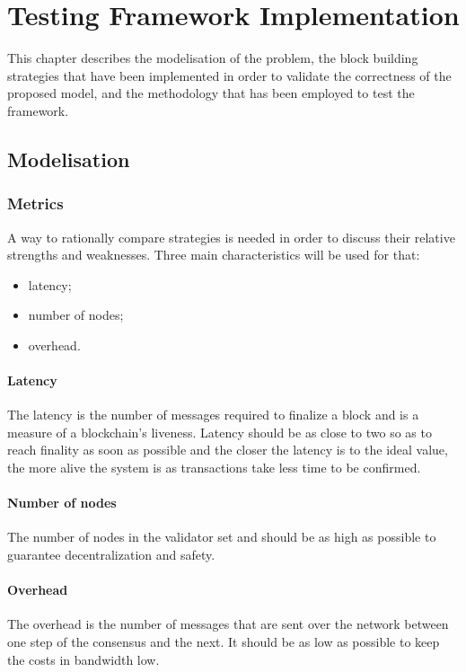 \chapter{Testing Framework Implementation}
\label{chap:implementation}

This chapter describes the modelisation of the problem, the block building
strategies that have been implemented in order to validate the correctness of
the proposed model, and the methodology that has been employed to test the
framework.

\section{Modelisation}
\subsection{Metrics}
\FloatBarrier
A way to rationally compare strategies is needed in order to discuss their
relative strengths and weaknesses. Three main characteristics will be used for
that:
\begin{itemize}
        \item latency;
        \item number of nodes;
        \item overhead.
\end{itemize}

\subsubsection{Latency}
The latency is the number of messages required to finalize a block and is a
measure of a blockchain's liveness. Latency should be as close to two so as to
reach finality as soon as possible and the closer the latency is to the ideal
value, the more alive the system is as transactions take less time to be
confirmed.

\subsubsection{Number of nodes}
The number of nodes in the validator set and should be as high as possible to
guarantee decentralization and safety.

\subsubsection{Overhead}
The overhead is the number of messages that are sent over the network between
one step of the consensus and the next. It should be as low as possible to keep
the costs in bandwidth low.

